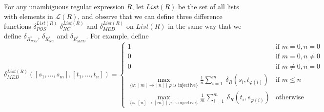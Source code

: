 \documentclass[acmsmall,review,anonymous]{acmart}\settopmatter{printfolios=true,printccs=false,printacmref=false}
\theoremstyle{definition}
\begin{document}
For any unambiguous regular expression $R$, let $List(R)$ be the set of all lists with elements in $\mathcal{L}(R)$, and observe that we can define three difference functions $\delta^{List(R)}_{POS}$ $\delta^{List(R)}_{NC}$ and $\delta^{List(R)}_{MED}$ on $List(R)$ in the same way that we define $\delta_{R^*_{POS}}$, $\delta_{R^*_{NC}}$ and $\delta_{R^*_{MED}}$. For example, define
$$
\delta^{List(R)}_{MED}([s_1, \ldots, s_m], [t_1, \ldots, t_n]) = 
\begin{cases}
1 & \text{if } m = 0, n = 0\\ 
0 & \text{if } m = 0, n \neq 0\\
0 & \text{if } m \neq 0, n = 0\\\max\limits_{\{\varphi : [m] \longrightarrow [n] \; | \; \varphi \text{ is injective}\}}\frac{1}{n}\sum\limits_{i=1}^{m}\ \delta_R(s_i, t_{\varphi(i)})& \text{if } m \leq n\\
\max\limits_{\{\varphi : [n] \longrightarrow [m] \; | \; \varphi \text{ is injective}\}}\frac{1}{m}\sum\limits_{i=1}^{m}\ \delta_R(t_i, s_{\varphi(i)})& \text{otherwise}
\end{cases}
$$
\end{document}
